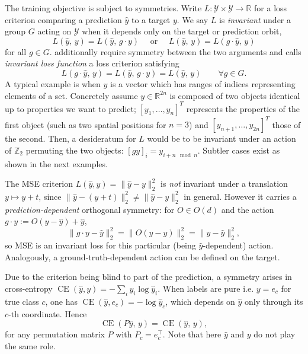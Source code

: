 \documentclass[mathematics,review,submit,moreauthors]{Definitions/mdpi}
\begin{document}
The training objective is subject to symmetries.
Write $L:\mathcal{Y}\times\mathcal{Y}\to\mathbb{R}$ for a loss criterion comparing a prediction $\hat y$ to a target $y$.
We say $L$ is \emph{invariant} under a group $G$ acting on $\mathcal{Y}$ when it depends only on the target or prediction orbit,
$$
L(\hat y,\, y) = L(\hat y,\, g\cdot y) \quad \text{ or } \quad L(\hat y,\, y) = L(g\cdot \hat y,\, y)
$$
for all $g\in G$.
\citet{kaba2025anips} additionally require symmetry between the two arguments and calls \emph{invariant loss function} a loss criterion satisfying
$$
L(g\cdot\hat y,\, y) = L(\hat y,\, g\cdot y) = L(\hat y,\, y) \qquad \forall g\in G.
$$
A typical example is when $y$ is a vector which has ranges of indices representing elements of a set.
Concretely assume $y\in \mathbb R^{2n}$ is composed of two objects identical up to properties we want to predict; $[y_1, \dots, y_n]^T$ represents the properties of the first object (such as two spatial positions for $n=3$) and $[y_{n+1}, \dots, y_{2n}]^T$ those of the second.
Then, a desideratum for $L$ would be to be invariant under an action of $\mathbb Z_2$ permuting the two objects: $[gy]_i=y_{i+n \mod n}$.
Subtler cases exist as shown in the next examples.

\begin{Example}
    The MSE criterion $L(\hat y,y)=\|\hat y-y\|_2^2$ is \emph{not} invariant under a translation $y\mapsto y+t$, since $\|\hat y-(y+t)\|_2^2\neq\|\hat y-y\|_2^2$ in general.
    However it carries a \emph{prediction-dependent} orthogonal symmetry: for $O\in O(d)$ and the action $g\cdot y:=O(y-\hat y)+\hat y$,
    $$
    \|g\cdot y-\hat y\|_2^2 = \|O(y-\hat y)\|_2^2 = \|y-\hat y\|_2^2,
    $$
    so MSE is an invariant loss for this particular (being $\hat y$-dependent) action.
    Analogously, a ground-truth-dependent action can be defined on the target.
\end{Example}

\begin{Example}\label{ex:false-class-symmetries}
    Due to the criterion being blind to part of the prediction, a symmetry arises in cross-entropy $\operatorname{CE}(\hat y, y)=-\sum_i y_i\log\hat y_i$.
    When labels are pure i.e. $y=e_c$ for true class $c$, one has $\operatorname{CE}(\hat y,e_c)=-\log \hat y_c$, which depends on $\hat y$ only through its $c$-th coordinate.
    Hence
    \begin{equation*}
        \operatorname{CE}(P\hat y,\, y)=\operatorname{CE}(\hat y,\, y),
    \end{equation*}
    for any permutation matrix $P$ with $P_{c} = e_c^{\top}$.
    Note that here $\hat y$ and $y$ do not play the same role.
\end{Example}
\end{document}
